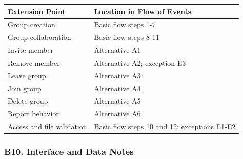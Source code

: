 \documentclass[12pt]{article}
\renewcommand{\baselinestretch}{1.5}
\begin{document}
\begingroup
\small
\renewcommand{\baselinestretch}{1.0}\selectfont
\renewcommand{\arraystretch}{1.15}
\setlength{\tabcolsep}{6pt}
\begin{longtable}{|>{\raggedright\arraybackslash}p{}|>{\raggedright\arraybackslash}p{}|}
\hline
\textbf{Extension Point} & \textbf{Location in Flow of Events} \\ \hline
\endhead
Group creation & Basic flow steps 1-7 \\ \hline
Group collaboration & Basic flow steps 8-11 \\ \hline
Invite member & Alternative A1 \\ \hline
Remove member & Alternative A2; exception E3 \\ \hline
Leave group & Alternative A3 \\ \hline
Join group & Alternative A4 \\ \hline
Delete group & Alternative A5 \\ \hline
Report behavior & Alternative A6 \\ \hline
Access and file validation & Basic flow steps 10 and 12; exceptions E1-E2 \\ \hline
\end{longtable}
\endgroup
\par\medskip

\hypertarget{sec:b10-interface-and-data-notes}{}
\subsubsection*{B10. Interface and Data Notes}
\par\medskip
\end{document}
